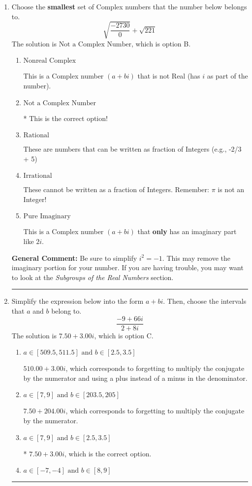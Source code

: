 \documentclass{extbook}[14pt]
\newcommand{\litem}[1]{\item #1

\rule{\textwidth}{0.4pt}}
\begin{document}
\begin{enumerate}\litem{
Choose the \textbf{smallest} set of Complex numbers that the number below belongs to.
\[ \sqrt{\frac{-2730}{0}}+\sqrt{221} \]
The solution is \( \text{Not a Complex Number} \), which is option B.\begin{enumerate}[label=\Alph*.]
\item \( \text{Nonreal Complex} \)

This is a Complex number $(a+bi)$ that is not Real (has $i$ as part of the number).
\item \( \text{Not a Complex Number} \)

* This is the correct option!
\item \( \text{Rational} \)

These are numbers that can be written as fraction of Integers (e.g., -2/3 + 5)
\item \( \text{Irrational} \)

These cannot be written as a fraction of Integers. Remember: $\pi$ is not an Integer!
\item \( \text{Pure Imaginary} \)

This is a Complex number $(a+bi)$ that \textbf{only} has an imaginary part like $2i$.
\end{enumerate}

\textbf{General Comment:} Be sure to simplify $i^2 = -1$. This may remove the imaginary portion for your number. If you are having trouble, you may want to look at the \textit{Subgroups of the Real Numbers} section.
}
\litem{
Simplify the expression below into the form $a+bi$. Then, choose the intervals that $a$ and $b$ belong to.
\[ \frac{-9 + 66 i}{2 + 8 i} \]
The solution is \( 7.50  + 3.00 i \), which is option C.\begin{enumerate}[label=\Alph*.]
\item \( a \in [509.5, 511.5] \text{ and } b \in [2.5, 3.5] \)

 $510.00  + 3.00 i$, which corresponds to forgetting to multiply the conjugate by the numerator and using a plus instead of a minus in the denominator.
\item \( a \in [7, 9] \text{ and } b \in [203.5, 205] \)

 $7.50  + 204.00 i$, which corresponds to forgetting to multiply the conjugate by the numerator.
\item \( a \in [7, 9] \text{ and } b \in [2.5, 3.5] \)

* $7.50  + 3.00 i$, which is the correct option.
\item \( a \in [-7, -4] \text{ and } b \in [8, 9] \)


\end{enumerate}}
\end{enumerate}
\end{document}
